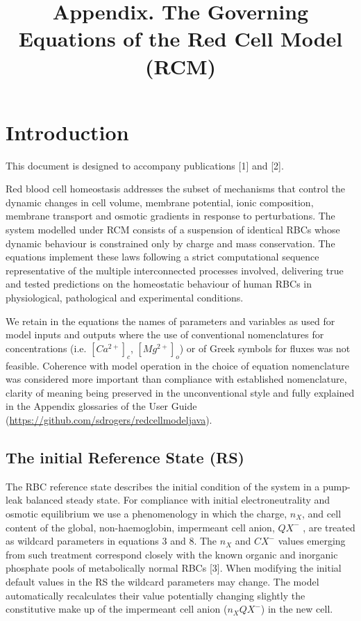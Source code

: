 \documentclass[a4paper]{article}
\title{Appendix. The Governing Equations of the Red Cell Model (RCM)}
\date{}
\makeatletter
\renewcommand\maketitle
  {\noindent
   {\Large\bfseries\@title}%
   \medskip\par\noindent
   {\large\bfseries\@author}%
   \hfill
   {\large\@date}%
   \bigskip\par\noindent
  }
\newcommand{\cell}[1]{C#1}
\newcommand{\nX}{n_{X}}
\newcommand{\CXm}{\cell{X^{-}}}
\newcommand{\QXm}{QX^{-}}
\makeatother
\begin{document}
\setcounter{page}{28}

\maketitle

\section{Introduction}\label{introduction}

This document is designed to accompany publications [1] and [2].

Red blood cell homeostasis addresses the subset of mechanisms that
control the dynamic changes in cell volume, membrane potential, ionic
composition, membrane transport and osmotic gradients in response to
perturbations. The system modelled under RCM consists of a suspension of identical
RBCs whose dynamic behaviour is constrained only by charge and mass
conservation. The equations implement these laws following a strict
computational sequence representative of the multiple interconnected
processes involved, delivering true and tested predictions on the
homeostatic behaviour of human RBCs in physiological, pathological and
experimental conditions.

We retain in the equations the names of parameters and variables as used for model inputs and outputs where the use of conventional nomenclatures for concentrations (i.e. $[Ca^{2+}]_c$, $[Mg^{2+}]_o$) or of Greek symbols for fluxes was not feasible.  Coherence with model operation in the choice of equation nomenclature was considered more important than compliance with established nomenclature, clarity of meaning being preserved in the unconventional style and fully explained in the Appendix glossaries of the User Guide (\url{https://github.com/sdrogers/redcellmodeljava}).


\subsection{The initial Reference State (RS)}

The RBC reference state describes the initial condition of the system in
a pump-leak balanced steady state. For compliance with initial
electroneutrality and osmotic equilibrium we use a phenomenology in
which the charge, $\nX$, and cell content of the global, non-haemoglobin,
impermeant cell anion, $\QXm$ , are treated as wildcard parameters in
equations 3 and 8. The $\nX$ and $\CXm$ values emerging from such treatment
correspond closely with the known organic and inorganic phosphate pools
of metabolically normal RBCs {[}3{]}. When modifying the initial default
values in the RS the wildcard parameters may change. The model
automatically recalculates their value potentially changing slightly the
constitutive make up of the impermeant cell anion ($\nX  \QXm$) in
the new cell.
\end{document}
